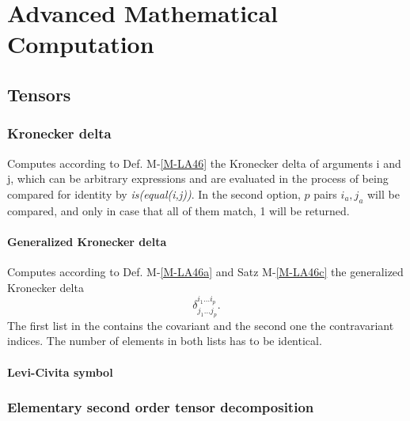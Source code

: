 \documentclass[../Maxima_Workbook.tex]{subfiles}
\begin{document}
\part{Advanced Mathematical Computation}

\chapter{Tensors}

\section{Kronecker delta}

\lz {} \hfill \tcr{[function]}

\lz Computes according to Def. M-\ref{M-LA46} the Kronecker delta of arguments i and j, which can be arbitrary expressions and are evaluated in the process of being compared for identity by \emph{is(equal(i,j))}. In the second option, $ p $ pairs $ i_a,j_a $ will be compared, and only in case that all of them match, 1 will be returned.

\subsection{Generalized Kronecker delta}

\lz {} \hfill {}

\lz Computes according to Def. M-\ref{M-LA46a} and Satz M-\ref{M-LA46c} the generalized Kronecker delta
\begin{equation*}
	\delta^{i_1 \dots i_p}_{j_1 \dots j_p}.
\end{equation*}
The first list in the contains the covariant and the second one the contravariant indices. The number of elements in both lists has to be identical.

\subsection{Levi-Civita symbol}

\section{Elementary second order tensor decomposition}
\end{document}
